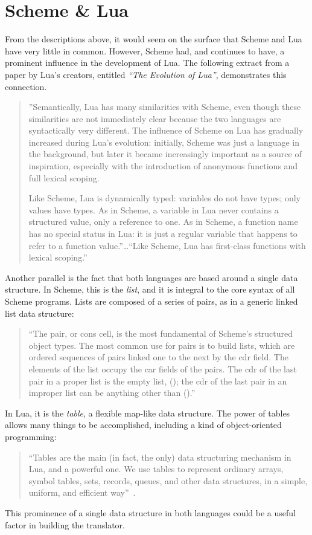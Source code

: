 \section{Scheme \& Lua}

From the descriptions above, it would seem on the surface that Scheme and Lua
have very little in common. However, Scheme had, and continues to have, a
prominent influence in the development of Lua. The following extract from a
paper by Lua's creators, entitled \emph{``The Evolution of Lua''}, demonstrates this connection.

\begin{quotation}
''Semantically, Lua has many similarities with Scheme, even though these
similarities are not immediately clear because the two languages are
syntactically very different. The influence of Scheme on Lua has gradually
increased during Lua's evolution: initially, Scheme was just a language in the
background, but later it became increasingly important as a source of
inspiration, especially with the introduction of anonymous functions and full
lexical scoping.

Like Scheme, Lua is dynamically typed: variables do not have types; only values
have types. As in Scheme, a variable in Lua never contains a structured value,
only a reference to one. As in Scheme, a function name has no special status in
Lua: it is just a regular variable that happens to refer to a function
value.''\ldots ``Like Scheme, Lua has first-class functions with lexical
scoping.''~\cite[Sec~2]{evolua}
\end{quotation}

\label{sec:listandtable}
Another parallel is the fact that both languages are based around a single data
structure. In Scheme, this is the \emph{list}, and it is integral to the core
syntax of all Scheme programs. Lists are composed of a series of pairs, as in a
generic linked list data structure:
\begin{quotation}
``The pair, or cons cell, is the most fundamental of Scheme's structured object
types. The most common use for pairs is to build lists, which are ordered
sequences of pairs linked one to the next by the cdr field. The elements of the
list occupy the car fields of the pairs. The cdr of the last pair in a proper
list is the empty list, (); the cdr of the last pair in an improper list can be
anything other than ().''~\cite[Sec~6.4]{tspl}
\end{quotation}

In Lua, it is the \emph{table}, a flexible map-like data structure. The power of
tables allows many things to be accomplished, including a kind of
object-oriented programming: 
\begin{quotation}
``Tables are the main (in fact, the only) data structuring mechanism in Lua, and
a powerful one. We use tables to represent ordinary arrays, symbol tables, sets,
records, queues, and other data structures, in a simple, uniform, and efficient
way''~\cite[p.14]{luabook}.
\end{quotation}

This prominence of a single data structure in both languages could be a useful
factor in building the translator.
